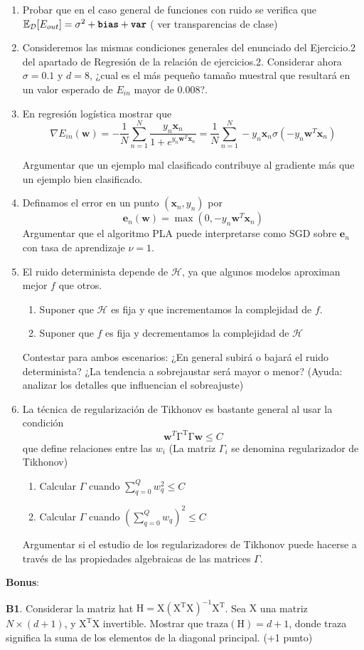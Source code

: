 \documentclass[  DIV=calc,%
paper=a4,%
fontsize=11pt]{scrartcl}             %
\begin{document}
\begin{enumerate}
    \item Probar que en el caso general de funciones con ruido se verifica que $\mathbb{E}_{\mathcal{D}}[E_{out}]= \sigma^2+\texttt{\textbf{bias}}+\texttt{\textbf{var}}$ ( ver transparencias de clase)

    \item  Consideremos las mismas condiciones generales del enunciado del Ejercicio.2 del apartado de Regresión de la relación de ejercicios.2.
    Considerar ahora $\sigma=0.1$ y $d=8$, ¿cual es el más pequeño tamaño muestral que resultará en un valor esperado de $E_{in}$ mayor de $0.008$?.
    \item En regresión logística mostrar que
    \[
    \nabla E_{in}(\textbf{w})=-\frac{1}{N}\sum_{n=1}^{N}\frac{y_n\textbf{x}_n}{1+e^{y_n \textbf{w}^T\textbf{x}_n}}= \frac{1}{N}\sum_{n=1}^{N}-y_n\textbf{x}_n\sigma(-y_n\textbf{w}^T\textbf{x}_n)
    \]

    Argumentar que un ejemplo mal clasificado contribuye  al gradiente más que un ejemplo bien clasificado.

    \item  Definamos el error en un punto $(\textbf{x}_n,y_n)$ por
    \[
    \textbf{e}_n(\textbf{w})=\max(0,-y_n\textbf{w}^T\textbf{x}_n)
    \]
    Argumentar que el algoritmo PLA puede interpretarse como SGD sobre $\textbf{e}_n$ con tasa de aprendizaje $\nu=1$.
    \item El ruido determinista depende de $\mathcal{H}$, ya que algunos modelos aproximan mejor $f$ que otros.
    \begin{enumerate}
      \item Suponer que $\mathcal{H}$ es fija y que incrementamos la complejidad de $f$.
      \item Suponer que $ f$ es fija y decrementamos la complejidad de $\mathcal{H}$
    \end{enumerate}
    Contestar para ambos escenarios: ¿En general subirá o bajará el ruido determinista? ¿La tendencia a sobrejaustar será mayor o menor? (Ayuda: analizar los detalles que influencian el sobreajuste)
    \item La técnica de regularización de Tikhonov es bastante general al usar la condición
    \[
    \textbf{w}^T\mathrm{\Gamma^T\Gamma}\textbf{w}\leq C
    \]
    que define relaciones entre las $w_i$ (La matriz $\Gamma_i$ se denomina regularizador de Tikhonov)
    \begin{enumerate}
      \item Calcular $\Gamma$ cuando $\sum_{q=0}^Q w_q^2 \leq C$
      \item Calcular $\Gamma$ cuando $(\sum_{q=0}^Q w_q)^2 \leq C$
    \end{enumerate}
    Argumentar si el estudio de los regularizadores de Tikhonov puede hacerse a través de las propiedades algebraicas de las matrices $\Gamma$.
  \end{enumerate}

  \textbf{Bonus}:

  \textbf{B1}. Considerar la matriz hat $\mathrm{H}=\mathrm{X(X^TX)^{-1}X^T}$. Sea $\mathrm{X}$ una matriz  $N\times (d+1)$, y $\mathrm{X^TX}$ invertible. Mostrar que $\mathrm{traza(H)}=d+1$, donde traza significa la suma de los elementos de la diagonal principal. (+1 punto)
\end{document}
